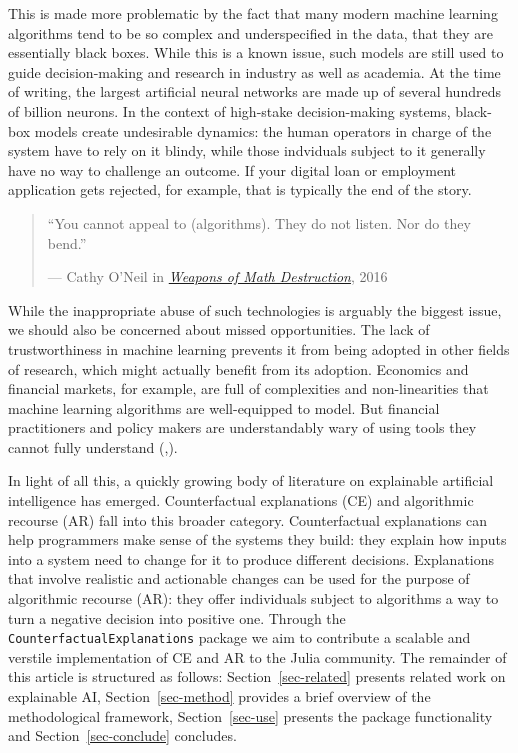 \documentclass{juliacon}
\begin{document}
This is made more problematic by the fact that many modern machine
learning algorithms tend to be so complex and underspecified in the
data, that they are essentially black boxes. While this is a known
issue, such models are still used to guide decision-making and research
in industry as well as academia. At the time of writing, the largest
artificial neural networks are made up of several hundreds of billion
neurons. In the context of high-stake decision-making systems, black-box
models create undesirable dynamics: the human operators in charge of the
system have to rely on it blindy, while those indviduals subject to it
generally have no way to challenge an outcome. If your digital loan or
employment application gets rejected, for example, that is typically the
end of the story.

\begin{quote}
``You cannot appeal to (algorithms). They do not listen. Nor do they
bend.''

--- Cathy O'Neil in
\href{https://en.wikipedia.org/wiki/Weapons_of_Math_Destruction}{\emph{Weapons
of Math Destruction}}, 2016
\end{quote}

While the inappropriate abuse of such technologies is arguably the
biggest issue, we should also be concerned about missed opportunities.
The lack of trustworthiness in machine learning prevents it from being
adopted in other fields of research, which might actually benefit from
its adoption. Economics and financial markets, for example, are full of
complexities and non-linearities that machine learning algorithms are
well-equipped to model. But financial practitioners and policy makers
are understandably wary of using tools they cannot fully understand
(\cite{oecd2021artificial},\cite{hansen2020virtue}).

In light of all this, a quickly growing body of literature on
explainable artificial intelligence has emerged. Counterfactual
explanations (CE) and algorithmic recourse (AR) fall into this broader
category. Counterfactual explanations can help programmers make sense of
the systems they build: they explain how inputs into a system need to
change for it to produce different decisions. Explanations that involve
realistic and actionable changes can be used for the purpose of
algorithmic recourse (AR): they offer individuals subject to algorithms
a way to turn a negative decision into positive one. Through the
\texttt{CounterfactualExplanations} package we aim to contribute a
scalable and verstile implementation of CE and AR to the Julia
community. The remainder of this article is structured as follows:
Section~\ref{sec-related} presents related work on explainable AI,
Section~\ref{sec-method} provides a brief overview of the methodological
framework, Section~\ref{sec-use} presents the package functionality and
Section~\ref{sec-conclude} concludes.
\end{document}
